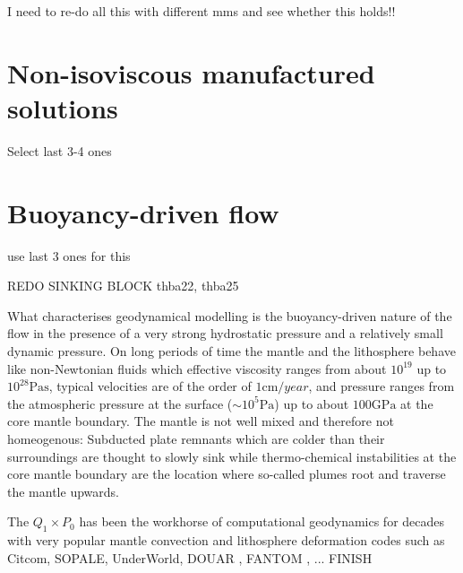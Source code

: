 \documentclass[a4paper]{article}
\begin{document}
{\color{red} I need to re-do all this with different mms and see whether this holds!!}


\section{Non-isoviscous manufactured solutions}



Select last 3-4 ones





\section{Buoyancy-driven flow}

use last 3 ones for this

REDO SINKING BLOCK thba22, thba25




What characterises geodynamical modelling is the buoyancy-driven nature of the flow 
in the presence of a very strong hydrostatic pressure and a relatively small dynamic pressure.
On long periods of time the mantle and the lithosphere behave like non-Newtonian fluids
which effective viscosity ranges from about $10^{19}$ up to $10^{28}\si{\pascal\second}$, 
typical velocities are of the order of $1\si{\cm\per year}$, and pressure ranges from 
the atmospheric pressure at the surface ($\sim 10^5 \si{\pascal}$) up to about $100\si{\giga\pascal}$ 
at the core mantle boundary. The mantle is not well mixed and therefore not homeogenous: 
Subducted plate remnants which are colder than their surroundings are thought to slowly sink 
while thermo-chemical instabilities at the core mantle boundary are the location where 
so-called plumes root and traverse the mantle upwards.



The $Q_1\times P_0$ has been the workhorse of computational geodynamics for decades with 
very popular mantle convection and lithosphere deformation codes such as Citcom, SOPALE, 
UnderWorld, DOUAR \cite{brtf08}, FANTOM \cite{thie11}, ... FINISH
\end{document}
